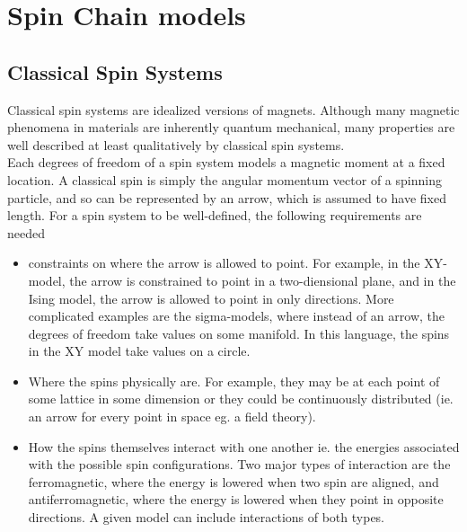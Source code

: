 \documentclass{homework}
\begin{document}
\section{Spin Chain models}

\subsection{Classical Spin Systems}

Classical spin systems are idealized versions of magnets. Although many magnetic phenomena in materials are inherently quantum mechanical, many properties are well described at least qualitatively by classical spin systems. \\

Each degrees of freedom of a spin system models a magnetic moment at a fixed location. A classical spin is simply the angular momentum vector of a spinning particle, and so can be represented by an arrow, which is assumed to have fixed length. For a spin system to be well-defined, the following requirements are needed 

\begin{itemize}
    \item constraints on where the arrow is allowed to point. For example, in the XY-model, the arrow is constrained to point in a two-diensional plane, and in the Ising model, the arrow is allowed to point in only directions. More complicated examples are the sigma-models, where instead of an arrow, the degrees of freedom take values on some manifold. In this language, the spins in the XY model take values on a circle. \\
    \item Where the spins physically are. For example, they may be at each point of some lattice in some dimension or they could be continuously distributed (ie. an arrow for every point in space eg. a field theory). \\
    \item How the spins themselves interact with one another ie. the energies associated with the possible spin configurations. Two major types of interaction are the ferromagnetic, where the energy is lowered when two spin are aligned, and antiferromagnetic, where the energy is lowered when they point in opposite directions. A given model can include interactions of both types. \\
\end{itemize}
\end{document}
